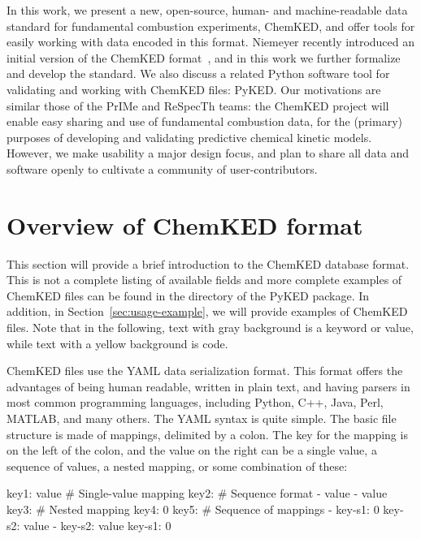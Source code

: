 \documentclass[12pt]{ussci}
\newcommand\ck{ChemKED}
\newcommand\pk{PyKED}
\begin{document}
In this work, we present a new, open-source, human- and machine-readable data standard for fundamental combustion
experiments, \ck{}, and offer tools for easily working with data encoded in this format.
Niemeyer recently introduced an initial version of the \ck{} format~\autocite{Niemeyer:2016wf},
and in this work we further formalize and develop the standard. We also discuss a related
Python software tool for validating and working with \ck{} files: \pk{}.
Our motivations are similar those of the PrIMe and ReSpecTh teams:
the \ck{} project will enable easy sharing and use of fundamental combustion data,
for the (primary) purposes of developing and validating predictive chemical kinetic models.
However, we make usability a major design focus, and plan to share all data and software openly
to cultivate a community of user-contributors.

\section{Overview of ChemKED format}\label{sec:overview-of-format}

This section will provide a brief introduction to the \ck{} database format.
This is not a complete listing of available fields and more complete examples of
\ck{} files can be found in the  directory of the \pk{} package. In
addition, in Section~\ref{sec:usage-example}, we will provide examples of \ck{}
files. Note that in the following, text with gray background is a 
keyword or value, while text with a yellow background is  code.

\ck{} files use the YAML data serialization format. This format offers the
advantages of being human readable, written in plain text, and having parsers in
most common programming languages, including Python, C++, Java, Perl, MATLAB,
and many others. The YAML syntax is quite simple. The basic file structure is
made of mappings, delimited by a colon. The key for the mapping is on the left
of the colon, and the value on the right can be a single value, a sequence of
values, a nested mapping, or some combination of these:
%
\begin{yamlbox}
key1: value  # Single-value mapping
key2:  # Sequence format
  - value
  - value
key3:  # Nested mapping
  key4: 0
key5:  # Sequence of mappings
  - key-s1: 0
    key-s2: value
  - key-s2: value
    key-s1: 0
\end{yamlbox}
\end{document}
